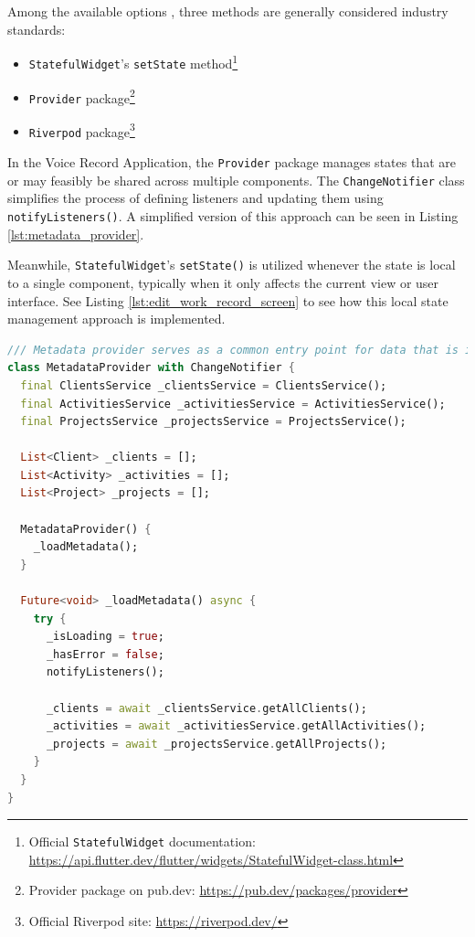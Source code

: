 \documentclass[
  digital,     %
  oneside,     %
  nosansbold,  %
  nocolorbold, %
  lof,         %
  lot,         %
]{fithesis4}
\begin{document}
Among the available options \cite{flutterStateMgmt}, three methods are generally considered industry standards:

\begin{itemize}
  \item \texttt{StatefulWidget}'s \texttt{setState} method\footnote{Official \texttt{StatefulWidget} documentation: \url{https://api.flutter.dev/flutter/widgets/StatefulWidget-class.html}}
  \item \texttt{Provider} package\footnote{Provider package on pub.dev: \url{https://pub.dev/packages/provider}}
  \item \texttt{Riverpod} package\footnote{Official Riverpod site: \url{https://riverpod.dev/}}
\end{itemize}

In the Voice Record Application, the \texttt{Provider} package manages states that are or may feasibly be shared across multiple components. The \texttt{ChangeNotifier} class simplifies the process of defining listeners and updating them using \texttt{notifyListeners()}. A simplified version of this approach can be seen in Listing \ref{lst:metadata_provider}.

Meanwhile, \texttt{StatefulWidget}'s \texttt{setState()} is utilized whenever the state is local to a single component, typically when it only affects the current view or user interface. See Listing \ref{lst:edit_work_record_screen} to see how this local state management approach is implemented.

\newpage
\begin{lstlisting}[language=Dart, caption={Provider example for MetadataProvider class}, label={lst:metadata_provider}, floatplacement=H, showstringspaces=false]
/// Metadata provider serves as a common entry point for data that is identical to all work records
class MetadataProvider with ChangeNotifier {
  final ClientsService _clientsService = ClientsService();
  final ActivitiesService _activitiesService = ActivitiesService();
  final ProjectsService _projectsService = ProjectsService();

  List<Client> _clients = [];
  List<Activity> _activities = [];
  List<Project> _projects = [];

  MetadataProvider() {
    _loadMetadata();
  }

  Future<void> _loadMetadata() async {
    try {
      _isLoading = true;
      _hasError = false;
      notifyListeners();

      _clients = await _clientsService.getAllClients();
      _activities = await _activitiesService.getAllActivities();
      _projects = await _projectsService.getAllProjects();
    }
  }
}
\end{lstlisting}
\end{document}
